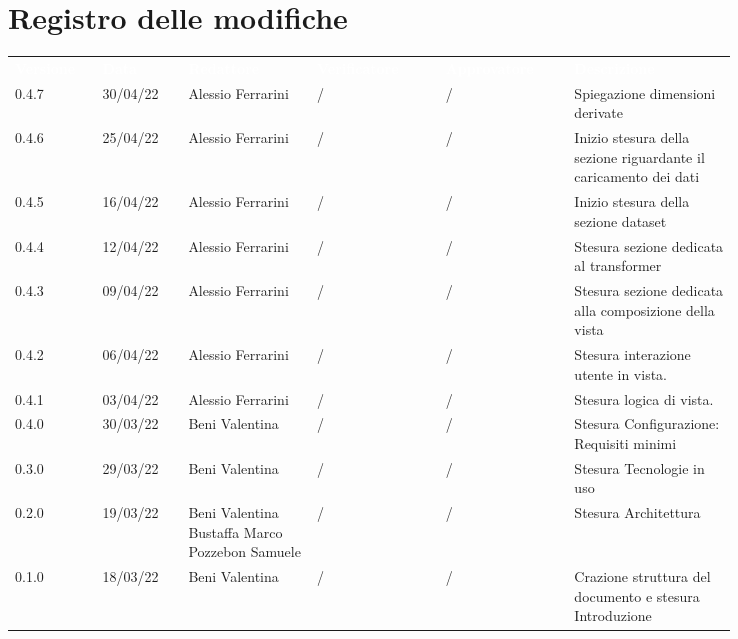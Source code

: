 \section*{Registro delle modifiche}

{\renewcommand{\arraystretch}{1.5}
\scriptsize
\begin{tabular}{p{0.10\linewidth}p{0.10\linewidth}p{0.15\linewidth}p{0.15\linewidth}p{0.15\linewidth}p{0.19\linewidth}}
	\rowcolor[RGB]{33, 73, 50}
	\textcolor{white}{\textbf{Versione}} & \textcolor{white}{\textbf{Data}} &
	\textcolor{white}{\textbf{Redattore}} & \textcolor{white}{\textbf{Verificatore}} &
	\textcolor{white}{\textbf{Approvatore}} & \textcolor{white}{\textbf{Descrizione}}\\
	\rowcolor[RGB]{216, 235, 171}
	0.4.7 & 30/04/22 & Alessio Ferrarini & / & / & Spiegazione dimensioni derivate
  \\
	\rowcolor[RGB]{233, 245, 206}
	0.4.6 & 25/04/22 & Alessio Ferrarini & / & / & Inizio stesura della sezione
  riguardante il caricamento dei dati \\
	\rowcolor[RGB]{216, 235, 171}
	0.4.5 & 16/04/22 & Alessio Ferrarini & / & / & Inizio stesura della sezione
  dataset \\
	\rowcolor[RGB]{233, 245, 206}
	0.4.4 & 12/04/22 & Alessio Ferrarini & / & / & Stesura sezione dedicata al
  transformer \\
	\rowcolor[RGB]{216, 235, 171}
	0.4.3 & 09/04/22 & Alessio Ferrarini & / & / & Stesura sezione dedicata alla
  composizione della vista \\
	\rowcolor[RGB]{233, 245, 206}
	0.4.2 & 06/04/22 & Alessio Ferrarini & / & / & Stesura interazione utente in
  vista. \\
	\rowcolor[RGB]{216, 235, 171}
	0.4.1 & 03/04/22 & Alessio Ferrarini & / & / & Stesura logica di vista. \\
	\rowcolor[RGB]{233, 245, 206}
	0.4.0 & 30/03/22 & Beni Valentina & / & / & Stesura Configurazione: Requisiti minimi\\
	\rowcolor[RGB]{216, 235, 171}
	0.3.0 & 29/03/22 & Beni Valentina & / & / & Stesura Tecnologie in uso\\
	\rowcolor[RGB]{233, 245, 206}
	0.2.0 & 19/03/22 & Beni Valentina Bustaffa Marco Pozzebon Samuele & / & / & Stesura Architettura\\
	\rowcolor[RGB]{216, 235, 171}
	0.1.0 & 18/03/22 & Beni Valentina & / & / & Crazione struttura del documento e stesura Introduzione\\	
\end{tabular}	
}
